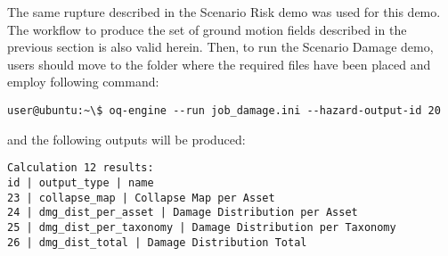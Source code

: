 The same rupture described in the Scenario Risk demo was used for this demo.
The workflow to produce the set of ground motion fields described in the
previous section is also valid herein. Then, to run the Scenario Damage demo,
users should move to the folder where the required files have been placed and
employ following command:

\begin{Verbatim}[frame=single, commandchars=\\\{\}, samepage=true]
user@ubuntu:~\$ oq-engine --run job_damage.ini --hazard-output-id 20
\end{Verbatim}

and the following outputs will be produced:

\begin{Verbatim}[frame=single, commandchars=\\\{\}, samepage=true]
Calculation 12 results:
id | output_type | name
23 | collapse_map | Collapse Map per Asset
24 | dmg_dist_per_asset | Damage Distribution per Asset
25 | dmg_dist_per_taxonomy | Damage Distribution per Taxonomy
26 | dmg_dist_total | Damage Distribution Total
\end{Verbatim}